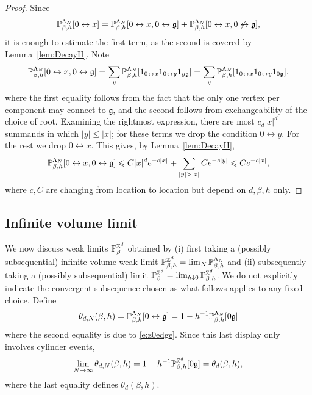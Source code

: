 \documentclass[11pt]{amsart}
\numberwithin{equation}{section}
\numberwithin{theorem}{section}
\newcommand{\ghost}{\mathfrak{g}}
\newcommand{\conn}{\leftrightarrow}
\newcommand{\nconn}{\not\leftrightarrow}
\newcommand{\1}{{\bf 1}}
\begin{document}
\begin{proof}
  Since
  \begin{equation}
    \P^{\Lambda_{N}}_{\beta,h}[0\conn x] =
    \P^{\Lambda_{N}}_{\beta,h}[0\conn x, 0\conn\ghost] +
    \P^{\Lambda_{N}}_{\beta,h}[0\conn x, 0\nconn\ghost],
  \end{equation}
  it is enough to estimate the first term, as the second is covered by
  Lemma~\ref{lem:DecayH}. Note
 \begin{align}
    \P^{\Lambda_{N}}_{\beta,h}[0\conn x, 0\conn\ghost] 
    =
      \sum_{y} \P^{\Lambda_{N}}_{\beta,h} [1_{0\conn x}1_{0\conn y}1_{y\ghost}]    = \sum_{y} \P^{\Lambda_{N}}_{\beta,h} [1_{0\conn x}1_{0\conn y}1_{0\ghost}]. 
  \end{align}
  where the first equality follows from the fact that the only one vertex per component may connect to $\mathfrak g$, and the second follows from exchangeability of the choice of root.
  Examining the rightmost expression, there are most $c_{d} |x |^{d}$ summands in which $|y |\leq  |x|$;
  for these terms we drop the condition $0\conn y$. For the rest we
  drop $0\conn x$. This gives,  by Lemma~\ref{lem:DecayH},
  \begin{equation}
    \P^{\Lambda_{N}}_{\beta,h}[0\conn x, 0\conn\ghost] 
    \leq C |x|^{d}e^{-c |x |} + \sum_{ |y |> |x |} Ce^{-c |y |} \leq
    Ce^{-c |x |},
  \end{equation}
  where $c,C$ are changing from location to location but depend on
  $d,\beta,h$ only.
\end{proof}



\subsection{Infinite volume limit}
\label{app:infvol}

We now discuss weak limits $\mathbb{P}^{\mathbb{Z}^d}_{\beta}$ obtained
by (i) first taking a (possibly subsequential) infinite-volume weak
limit $\mathbb{P}^{\mathbb{Z}^d}_{\beta,h} = \lim_{N}\mathbb{P}^{\Lambda_N}_{\beta,h}$ and
(ii) subsequently taking a (possibly subsequential) limit
$\mathbb{P}^{\mathbb{Z}^d}_{\beta}=\lim_{h\downarrow 0 }\mathbb{P}^{\mathbb{Z}^d}_{\beta,h}$. We
do not explicitly indicate the convergent subsequence chosen as what
follows applies to any fixed choice.
%
Define 
\begin{equation}
  \label{eq:thetaNh}
  \theta_{d,N}(\beta,h) \bydef
  \P^{\Lambda_N}_{\beta,h}[0\conn\ghost]=1-h^{-1}\P^{\Lambda_N}_{\beta,h}[0\ghost]
\end{equation}
where the second equality is due to \eqref{e:z0edge}.
Since this last display only involves cylinder events,
\begin{equation}
  \lim_{N\to\infty}\theta_{d,N}(\beta,h) = 1-h^{-1}\P^{\Z^d}_{\beta,h}[0\ghost] \bydef \theta_{d}(\beta,h),
\end{equation}
where the last equality defines $\theta_{d}(\beta,h)$.
\end{document}
